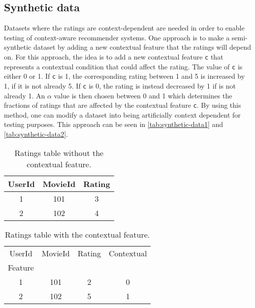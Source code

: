 \subsection{Synthetic data}
Datasets where the ratings are context-dependent are needed in order to enable testing of context-aware recommender systems.
One approach is to make a semi-synthetic dataset by adding a new contextual feature that the ratings will depend on\cite{baltrunasContextItemSplit}.
For this approach, the idea is to add a new contextual feature \texttt{c} that represents a contextual condition that could affect the rating.
The value of \texttt{c} is either 0 or 1. 
If \texttt{c} is 1, the corresponding rating between 1 and 5 is increased by 1, if it is not already 5.
If \texttt{c} is 0, the rating is instead decreased by 1 if is not already 1.
An $\alpha$ value is then chosen between 0 and 1 which determines the fractions of ratings that are affected by the contextual feature \texttt{c}.
By using this method, one can modify a dataset into being artificially context dependent for testing purposes.
This approach can be seen in \autoref{tab:synthetic-data1} and \autoref{tab:synthetic-data2}.
\begin{table*}[hbt!]
    \centering
    \begin{tabular}{|c|c|c|}
    \hline
    UserId & MovieId & Rating \\ [0.5ex] 
    \hline\hline
    1 & 101 & 3 \\
    \hline
    2 & 102 & 4 \\
    \hline
    \end{tabular}
    \caption{Ratings table without the contextual feature.}
    \label{tab:synthetic-data1}
\end{table*}
\begin{table*}[hbt!]
    \centering
    \begin{tabular}{|c|c|c|c|} 
    \hline
    UserId & MovieId & Rating & Contextual\\Feature \\ [0.5ex] 
    \hline\hline
    1 & 101 & 2 & 0 \\
    \hline
    2 & 102 & 5 & 1 \\
    \hline
    \end{tabular}
    \caption{Ratings table with the contextual feature.}
    \label{tab:synthetic-data2}
\end{table*}
